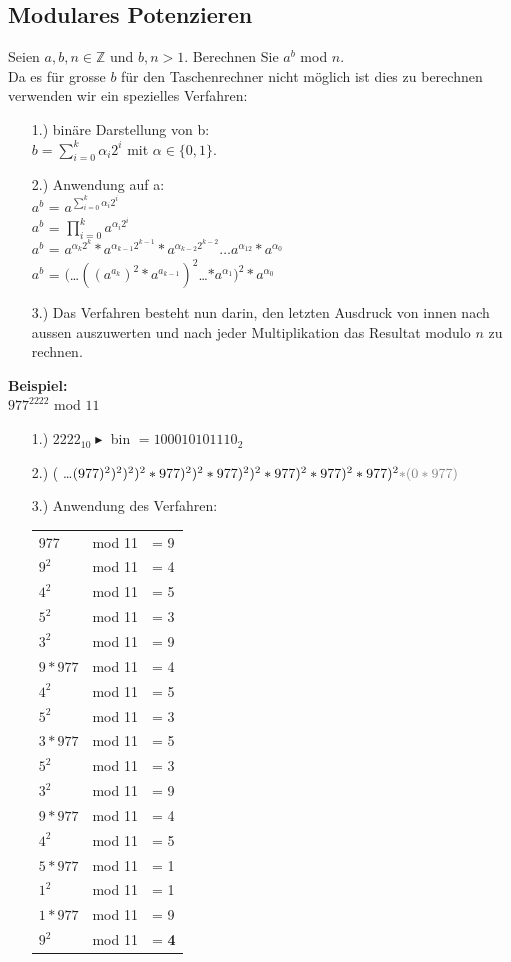 \documentclass[10pt]{article}
\newcommand{\ZN}{\mathbb{Z}} %
\begin{document}
\subsection{Modulares Potenzieren}
Seien $a,b,n \in \ZN$ und $b,n > 1$. Berechnen Sie $a^b$ mod $n$. \\
Da es für grosse $b$ für den Taschenrechner nicht möglich ist dies zu berechnen verwenden wir ein spezielles Verfahren:
\begin{itemize}
	\item[1.)] binäre Darstellung von b: \\
		$b=\sum_{i=0}^k \alpha_i2^i$ mit $\alpha \in \{0,1\}$.
	\item[2.)] Anwendung auf a: \\
		$a^b$ = $a^{\sum_{i=0}^k \alpha_i2^i}$\\
		$a^b$ = $\prod_{i=0}^{k} a^{\alpha_i2^i}$ \\
		$a^b$ = $a^{\alpha_k2^k}*a^{\alpha_{k-1}2^{k-1}}*a^{\alpha_{k-2}2^{k-2}} \dots  a^{\alpha_12}*a^{\alpha_0}$ \\
		$a^b$ = $($\dots$((a^{a_k})^2*a^{a_{k-1}})^2$\dots$*a^{\alpha_1})^2*a^{\alpha_0}$
	\item[3.)] Das Verfahren besteht nun darin, den letzten Ausdruck von innen nach aussen auszuwerten und nach jeder Multiplikation das Resultat modulo $n$ zu rechnen.
\end{itemize}
\textbf{Beispiel:} \\
$977^{2222}$ mod $11$
\begin{itemize}
	\item[1.)] $2222_{10} \blacktriangleright$ bin $= 100010101110_2$
	\item[2.)] ( \dots $ (977)^2)^2)^2)^2*977)^2)^2*977)^2)^2*977)^2*977)^2*977)^2 {\color{gray} *(0*977)}$
	\item[3.)] Anwendung des Verfahren: \\
	\begin{tabular}{l l l}
	 977 & mod 11 & = 9 \\
	 $9^2$ & mod 11 & = 4 \\
	 $4^2$ & mod 11 & = 5 \\
	 $5^2$ & mod 11 & = 3 \\
	 $3^2$ & mod 11 & = 9 \\
	 $9*977$ & mod 11 & = 4\\
	 $4^2$ & mod 11 & = 5\\
	 $5^2$ & mod 11 & = 3\\
	 $3*977$ & mod 11 & = 5\\
	 $5^2$ & mod 11 & = 3\\
	 $3^2$ & mod 11 & = 9\\
	 $9*977$ & mod 11 & = 4\\
	 $4^2$ & mod 11 & = 5\\
	 $5*977$ & mod 11 & = 1\\
	 $1^2$ & mod 11 & = 1\\
	 $1*977$ & mod 11 & = 9\\
	 $9^2$ & mod 11 & = \textbf{4}
	\end{tabular}
\end{itemize}
\end{document}
